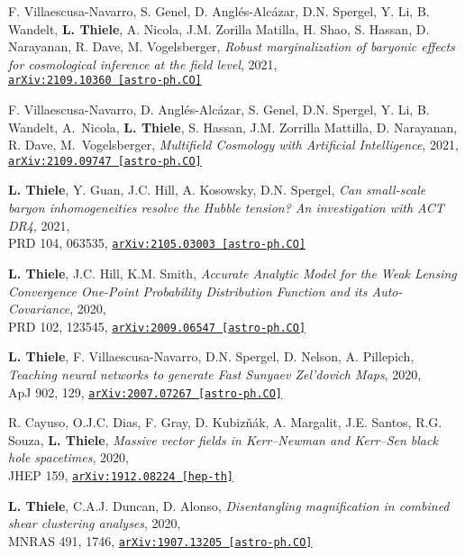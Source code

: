 \newpage
\vspace*{0.5cm}

F. Villaescusa-Navarro, S. Genel, D. Angl\'es-Alc\'azar, D.N. Spergel, Y. Li,
B. Wandelt, {\bf L. Thiele}, A. Nicola, J.M. Zorilla Matilla, H. Shao,
S. Hassan, D. Narayanan, R. Dave, M. Vogelsberger,
\emph{Robust marginalization of baryonic effects for cosmological inference
      at the field level}, 2021,\\
\href{https://arxiv.org/abs/2109.10360}{\mbox{\texttt{arXiv:2109.10360 [astro-ph.CO]}}}

F. Villaescusa-Navarro, D. Angl\'es-Alc\'azar, S. Genel, D.N. Spergel, Y. Li,
B. Wandelt, A.~Nicola, {\bf L. Thiele}, S. Hassan, J.M. Zorrilla Mattilla,
D. Narayanan, R. Dave, M.~Vogelsberger,
\emph{Multifield Cosmology with Artificial Intelligence}, 2021,\\
\href{https://arxiv.org/abs/2109.09747}{\mbox{\texttt{arXiv:2109.09747 [astro-ph.CO]}}}

{\bf L. Thiele}, Y. Guan, J.C. Hill, A. Kosowsky, D.N. Spergel,
\emph{Can small-scale baryon inhomogeneities resolve the Hubble tension?
      An investigation with ACT DR4}, 2021,\\
PRD 104, 063535,
\href{https://arxiv.org/abs/2105.03003}{\mbox{\texttt{arXiv:2105.03003 [astro-ph.CO]}}}

{\bf L. Thiele}, J.C. Hill, K.M. Smith,
\emph{Accurate Analytic Model for the Weak Lensing Convergence One-Point Probability
      Distribution Function and its Auto-Covariance}, 2020,\\
PRD 102, 123545,
\href{https://arxiv.org/abs/2009.06547}{\mbox{\texttt{arXiv:2009.06547 [astro-ph.CO]}}}

{\bf L. Thiele}, F. Villaescusa-Navarro, D.N. Spergel, D. Nelson, A. Pillepich,
\emph{Teaching neural networks to generate Fast Sunyaev Zel'dovich Maps}, 2020,\\
ApJ 902, 129,
\href{https://arxiv.org/abs/2007.07267}{\mbox{\texttt{arXiv:2007.07267 [astro-ph.CO]}}}

R. Cayuso, O.J.C. Dias, F. Gray, D. Kubiz\v{n}\'{a}k, A. Margalit, J.E. Santos,
R.G. Souza, {\bf L. Thiele},
\emph{Massive vector fields in Kerr--Newman and Kerr--Sen black hole spacetimes}, 2020,\\
JHEP 159,
\href{https://arxiv.org/abs/1912.08224}{\mbox{\texttt{arXiv:1912.08224 [hep-th]}}}

{\bf L. Thiele}, C.A.J. Duncan, D. Alonso,
\emph{Disentangling magnification in combined shear clustering analyses}, 2020,\\
MNRAS 491, 1746,
\href{https://arxiv.org/abs/1907.13205}{\mbox{\texttt{arXiv:1907.13205 [astro-ph.CO]}}}

